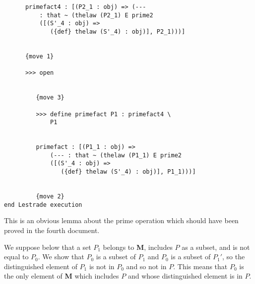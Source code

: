 \documentclass[12pt]{article}
\begin{document}
\begin{verbatim}
      primefact4 : [(P2_1 : obj) => (--- 
          : that ~ (thelaw (P2_1) E prime2 
          ([(S'_4 : obj) => 
             ({def} thelaw (S'_4) : obj)], P2_1)))]


      {move 1}

      >>> open


         {move 3}

         >>> define primefact P1 : primefact4 \
             P1


         primefact : [(P1_1 : obj) => 
             (--- : that ~ (thelaw (P1_1) E prime2 
             ([(S'_4 : obj) => 
                ({def} thelaw (S'_4) : obj)], P1_1)))]


         {move 2}
end Lestrade execution
\end{verbatim}

This is an obvious lemma about the prime operation which should have been proved in the fourth document.  

We suppose below that a set $P_1$ belongs to {\bf M}, includes $P$ as a subset, and is not equal to $P_0$.  We show that $P_0$ is a subset of $P_1$
and $P_0$ is a subset of $P_1'$, so the distinguished element of $P_1$ is not in $P_0$ and so not in $P$.  This means that $P_0$ is the only element of {\bf M} which includes $P$ and whose distinguished element is in $P$.
\end{document}
